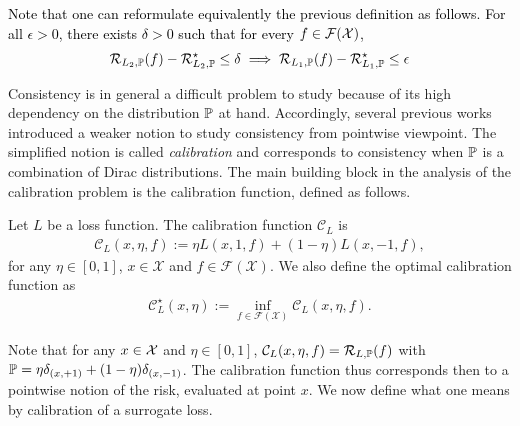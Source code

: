 \textcolor{black}{
Note that one can reformulate equivalently the previous definition as follows.  For all $\epsilon>0$, there exists $\delta>0$ such that for every $f\in\mathcal{F}(\mathcal{X})$,
\begin{align*}
    \mathcal{R}_{L_2,\mathbb{P}}(f)- \mathcal{R}_{L_2,\mathbb{P}}^\star\leq\delta\implies\mathcal{R}_{L_1,\mathbb{P}}(f)-\mathcal{R}_{L_1,\mathbb{P}}^\star\leq\epsilon
\end{align*}
}

Consistency is in general a difficult problem to study because of its high dependency on the distribution $\mathbb{P}$ at hand. Accordingly, several previous works~\citep{zhang2004statistical,bartlett2002rademacher,steinwart2007compare} introduced a weaker notion to study consistency from pointwise viewpoint. The simplified notion is called \textit{calibration} and corresponds to consistency when $\mathbb{P}$ is a combination of Dirac distributions. The main building block in the analysis of the calibration problem is the calibration function, defined as follows.

\begin{definition}
Let $L$ be a loss function. The calibration function $\mathcal{C}_L$ is 
\begin{align*}
    \mathcal{C}_L(x,\eta,f):=\eta L(x,1,f) +(1-\eta) L(x,-1,f),
\end{align*}
for any $\eta\in[0,1]$, $x\in\mathcal{X}$ and $f\in\mathcal{F}(\mathcal{X})$. We also define the optimal calibration function as
\begin{align*}
        \mathcal{C}^\star_L(x,\eta):=\inf_{f\in\mathcal{\mathcal{F}(\mathcal{X})}}\mathcal{C}_L(x,\eta,f).
\end{align*}

\end{definition}

Note that for any $x\in\mathcal{X}$ and $\eta\in[0,1]$, $\mathcal{C}_L(x,\eta,f) =\mathcal{R}_{L,\mathbb{P}}(f)$ with $\mathbb{P} = \eta \delta_{(x,+1)}+ (1-\eta)\delta_{(x,-1)}$. The calibration function thus corresponds then to a pointwise notion of the risk, evaluated at point $x$. We now define what one means by calibration of a surrogate loss.

